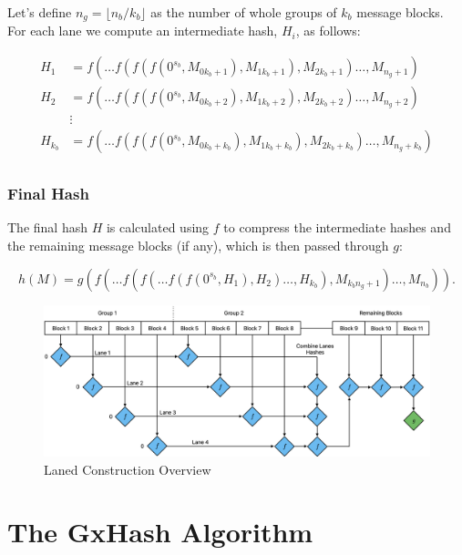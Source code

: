 \documentclass[10pt]{article}
\begin{document}
Let's define \( n_g = \lfloor {n_b}/{k_b} \rfloor \) as the number of whole groups of \( k_b \) message blocks. \\
For each lane we compute an intermediate hash, \( H_i \), as follows:

\begin{align*}
H_{1} &= f(\ldots f(f(f(0^{s_b}, M_{0k_b + 1}), M_{1k_b + 1}), M_{2k_b + 1})\ldots, M_{n_g + 1}) \\
H_{2} &= f(\ldots f(f(f(0^{s_b}, M_{0k_b + 2}), M_{1k_b + 2}), M_{2k_b + 2})\ldots, M_{n_g + 2}) \\
&\vdots \\
H_{k_b} &= f(\ldots f(f(f(0^{s_b}, M_{0k_b + k_b}), M_{1k_b + k_b}), M_{2k_b + k_b})\ldots, M_{n_g + k_b}) \\
\end{align*}

\subsubsection{Final Hash}

The final hash \( H \) is calculated using \( f \) to compress the intermediate hashes and the remaining message blocks (if any),
which is then passed through \( g \):

\begin{equation*}
h(M) = g\left( f( \ldots f(f(\ldots f(f(0^{s_b}, H_1), H_2) \ldots, H_{k_b}), M_{{k_b}{n_g}+1}) \ldots, M_{n_b} ) \right).
\end{equation*}

\begin{figure}[H]
\centering
\includegraphics[width=1\textwidth]{laned-construction.png}
\caption{Laned Construction Overview}
\label{fig:linear-construction}
\end{figure}

\clearpage
\section{The GxHash Algorithm}
\end{document}
